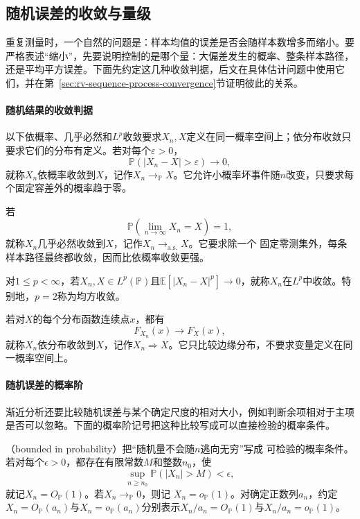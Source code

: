 \subsection{随机误差的收敛与量级}
\label{sec:stoch-convergence-criteria}
重复测量时，一个自然的问题是：样本均值的误差是否会随样本数增多而缩小。要严格表述“缩小”，先要说明控制的是哪个量：大偏差发生的概率、整条样本路径，还是平均平方误差。下面先约定这几种收敛判据，后文在具体估计问题中使用它们，并在第~\ref{sec:rv-sequence-process-convergence}节证明彼此的关系。
\paragraph{随机结果的收敛判据}
\begin{definition}[随机变量的收敛]
  \label{def:probability-random-convergence}
以下依概率、几乎必然和\(L^p\)收敛要求\(X_n,X\)定义在同一概率空间上；依分布收敛只要求它们的分布有定义。若对每个\(\varepsilon>0\)，
\[ \mathbb{P}(|X_n-X|>\varepsilon)\to0, \]
就称\(X_n\)依概率收敛到\(X\)，记作\(X_n\to_{\mathbb{P}}X\)。它允许小概率坏事件随\(n\)改变，只要求每个固定容差外的概率趋于零。

若
\[ \mathbb{P}\left(
    \lim_{n\to\infty}X_n=X\right)=1, \]
就称\(X_n\)几乎必然收敛到\(X\)，记作\(X_n\to_{\mathrm{a.s.}}X\)。它要求除一个
固定零测集外，每条样本路径最终都收敛，因而比依概率收敛更强。

对\(1\leq p<\infty\)，若\(X_n,X\in L^p(\mathbb P)\)且\(\mathbb{E}[|X_n-X|^p]\to0\)，就称\(X_n\)在\(L^p\)中收敛。特别地，\(p=2\)称为均方收敛。

若对\(X\)的每个分布函数连续点\(x\)，都有
\[ F_{X_n}(x)\to F_X(x), \]
就称\(X_n\)依分布收敛到\(X\)，记作\(X_n\Rightarrow X\)。它只比较边缘分布，不要求变量定义在同一概率空间上。

\end{definition}

\paragraph{随机误差的概率阶}
渐近分析还要比较随机误差与某个确定尺度的相对大小，例如判断余项相对于主项是否可以忽略。下面的概率阶记号把这种比较写成可以直接检验的概率条件。
\begin{definition}[概率阶记号]
  \label{def:statistics-probability-order}
（bounded in probability）把“随机量不会随\(n\)逃向无穷”写成
可检验的概率条件。若对每个\(\epsilon>0\)，都存在有限常数\(M\)和整数\(n_0\)，使
\[
  \sup_{n\geq n_0}\mathbb{P}(|X_n|>M)<\epsilon,
\]
就记\(X_n=O_{\mathbb{P}}(1)\)。若\(X_n\to_{\mathbb{P}}0\)，则记
\(X_n=o_{\mathbb{P}}(1)\)。对确定正数列\(a_n\)，约定\(X_n=O_{\mathbb P}(a_n)\)与\(X_n=o_{\mathbb P}(a_n)\)分别表示\(X_n/a_n=O_{\mathbb P}(1)\)与\(X_n/a_n=o_{\mathbb P}(1)\)。
\end{definition}

